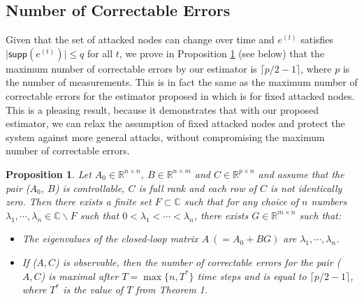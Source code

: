 \documentclass[twocolumn]{autart}    %
\newtheorem{Prop}{\bf{Proposition}}
\newcommand{\rev}[1]{{\normalsize{{{\color{blue}#1}}}}}
\begin{document}
%
\vspace{-0.4cm}
\subsection{Number of Correctable Errors}\label{sec:max_q}
\vspace{-0.4cm}
Given that the set of attacked nodes can change over time and $e^{(t)}$ satisfies $\lvert \textsf{supp} (e^{(t)}) \rvert \le q$ for all $t$, we prove in Proposition \ref{prop:maximum} (see below) that the maximum number of correctable errors by our \rev{estimator} is $\lceil p/2-1 \rceil$, where $p$ is the number of measurements. This is in fact the same as the maximum number of correctable errors for the \rev{estimator} proposed in \cite{Fawzi2014} which is for fixed attacked nodes.
This is a pleasing result, because it demonstrates that with our proposed \rev{estimator}, we can relax the assumption of fixed attacked nodes and protect the system against more general attacks, without compromising the maximum number of correctable errors. 
\vspace{-0.35cm}
\begin{Prop}\label{prop:maximum} 
Let $A_0 \in \mathbb{R}^{n \times n}$, $B \in \mathbb{R}^{n \times m}$ and $C \in \mathbb{R}^{p \times n}$ and assume that the pair ($A_0$, $B$) is controllable, $C$ is full rank and each row of $C$ is not identically zero. Then there exists a finite set $F \subset \mathbb{C}$ such that for any choice of $n$ numbers $\lambda_1, \cdots, \lambda_n \in \mathbb{C} \backslash F$ such that $0<\lambda_1< \cdots < \lambda_n$, there exists $G \in \mathbb{R}^{m \times n}$ such that:
\vspace{-0.4cm}
\begin{itemize}
\item
The eigenvalues of the closed-loop matrix $A~(= A_0+BG)$ are $\lambda_1, \cdots, \lambda_n$.
\item
If ($A, C$) is observable, then the number of correctable errors for the pair ($A, C$) is maximal after $T= \max\{n, T^*\}$ time steps and is equal to $\lceil p/2-1 \rceil$, where $T^*$ is the value of $T$ from Theorem 1. 
\end{itemize}
\end{Prop}
\end{document}
